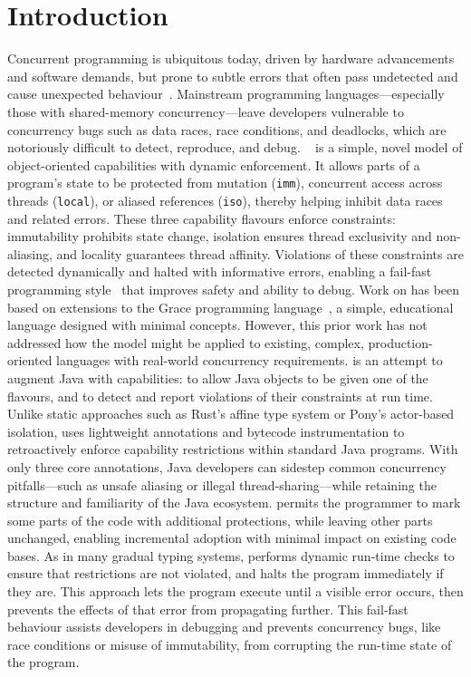 \section{Introduction}
%
Concurrent programming is ubiquitous today, driven by hardware advancements and software demands, but prone to subtle errors that often pass undetected and cause unexpected behaviour~\cite{lu2008learning,musuvathi2008finding,lin2015jacontebe}. Mainstream programming languages—especially those with shared-memory concurrency—leave developers vulnerable to concurrency bugs such as data races, race conditions, and deadlocks, which are notoriously difficult to detect, reproduce, and debug.
%
\dala~\cite{Dala_Paper,DafnyExperience-Noble2024} is a simple, novel model of object-oriented capabilities with dynamic enforcement. It allows parts of a program’s state to be protected from mutation (\texttt{imm}), concurrent access across threads (\texttt{local}), or aliased references (\texttt{iso}), thereby helping inhibit data races and related errors. These three capability flavours enforce constraints: immutability prohibits state change, isolation ensures thread exclusivity and non-aliasing, and locality guarantees thread affinity. Violations of these constraints are detected dynamically and halted with informative errors, enabling a fail-fast programming style~\cite{shore2004fail} that improves safety and ability to debug.
%
Work on \dala has been based on extensions to the Grace programming language~\cite{GraceAbsence-Black2012}, a simple, educational language designed with minimal concepts. However, this prior work has not addressed how the model might be applied to existing, complex, production-oriented languages with real-world concurrency requirements.
%
\jdala is an attempt to augment Java with \dala capabilities: to allow Java objects to be given one of the \dala flavours, and to detect and report violations of their constraints at run time. Unlike static approaches such as Rust’s affine type system or Pony’s actor-based isolation, \jdala uses lightweight annotations and bytecode instrumentation to retroactively enforce capability restrictions within standard Java programs. With only three core annotations, Java developers can sidestep common concurrency pitfalls—such as unsafe aliasing or illegal thread-sharing—while retaining the structure and familiarity of the Java ecosystem.
%
\jdala permits the programmer to mark some parts of the code with additional protections, while leaving other parts unchanged, enabling incremental adoption with minimal impact on existing code bases. As in many gradual typing systems, \jdala performs dynamic run-time checks to ensure that restrictions are not violated, and halts the program immediately if they are. This approach lets the program execute until a visible error occurs, then prevents the effects of that error from propagating further. This fail-fast behaviour assists developers in debugging and prevents concurrency bugs, like race conditions or misuse of immutability, from corrupting the run-time state of the program.
